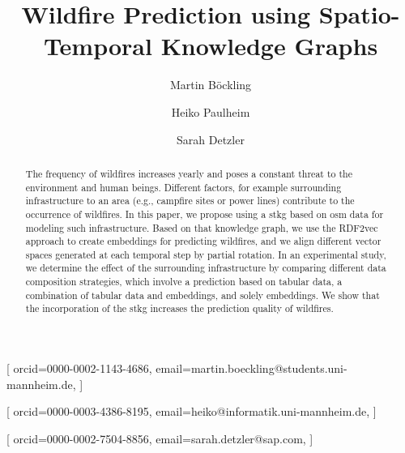 \documentclass[
]{ceurart}
\begin{document}


\title{Wildfire Prediction using Spatio-Temporal Knowledge Graphs}

\author[1,2]{Martin B\"ockling}[%
orcid=0000-0002-1143-4686,
email=martin.boeckling@students.uni-mannheim.de,
]
\cormark[1]
\fnmark[1]
\address[1]{University of Mannheim, Data and Web Science Group,
  B6, 26, 68161 Mannheim}
\address[2]{SAP SE,
  Dietmar-Hopp-Allee 16, 69190 Walldorf}

\author[1]{Heiko Paulheim}[%
orcid=0000-0003-4386-8195,
email=heiko@informatik.uni-mannheim.de,
]
\cormark[1]
\fnmark[1]

\author[2]{Sarah Detzler}[%
orcid=0000-0002-7504-8856,
email=sarah.detzler@sap.com,
]
\cormark[1]
\fnmark[1]


\begin{abstract}
  The frequency of wildfires increases yearly and poses a constant threat to the environment and human beings. Different factors, for example surrounding infrastructure to an area (e.g., campfire sites or power lines) contribute to the occurrence of wildfires. In this paper, we propose using a \gls*{stkg} based on \gls*{osm} data for modeling such infrastructure. Based on that knowledge graph, we use the RDF2vec approach to create embeddings for predicting wildfires, and we align different vector spaces generated at each temporal step by partial rotation. In an experimental study, we determine the effect of the surrounding infrastructure by comparing different data composition strategies, which involve a prediction based on tabular data, a combination of tabular data and embeddings, and solely embeddings. We show that the incorporation of the \gls*{stkg} increases the prediction quality of wildfires.
\end{abstract}
\end{document}

